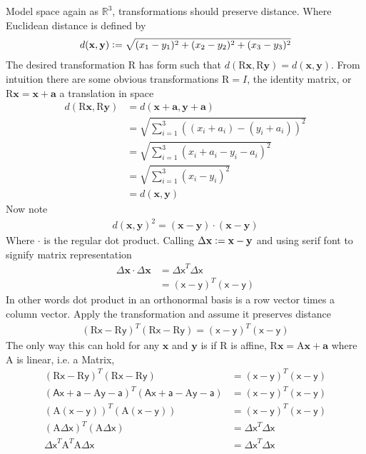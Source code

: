 Model space again as $\mathbb{R}^3$, transformations should preserve distance. Where Euclidean distance is defined by
\begin{align*}
d(\mathbf{x},\mathbf{y})\vcentcolon = \sqrt{(x_1-y_1)^2+(x_2-y_2)^2+(x_3-y_3)^2}
\end{align*}
 The desired transformation $\mathrm{R}$ has form such that $d(\mathrm{R}\mathbf{x},\mathrm{R}\mathbf{y}) = d(\mathbf{x},\mathbf{y})$. From intuition there are some obvious transformations $\mathrm{R}=I$, the identity matrix, or $\mathrm{R}\mathbf{x} = \mathbf{x}+\mathbf{a}$ a translation in space
\begin{align*}
d(\mathrm{R}\mathbf{x},\mathrm{R}\mathbf{y}) &= d(\mathbf{x}+\mathbf{a},\mathbf{y}+\mathbf{a}) \\
&= \sqrt{\sum_{i=1}^3((x_i+a_i)-(y_i+a_i))^2} \\
&= \sqrt{\sum_{i=1}^3(x_i+a_i-y_i-a_i)^2} \\
&= \sqrt{\sum_{i=1}^3(x_i-y_i)^2} \\
&= d(\mathbf{x},\mathbf{y})
\end{align*}
Now note
\begin{align*}
d(\mathbf{x},\mathbf{y})^2=(\mathbf{x}-\mathbf{y})\cdot(\mathbf{x}-\mathbf{y})
\end{align*}
Where $\cdot$ is the regular dot product. Calling $\Delta\mathbf{x}\vcentcolon =\mathbf{x}-\mathbf{y}$ and using serif font to signify matrix representation
\begin{align*}
\Delta\mathbf{x}\cdot\Delta\mathbf{x} &= \mathsf{\Delta x}^T \mathsf{\Delta x} \\
&= (\mathsf{x}-\mathsf{y})^T(\mathsf{x}-\mathsf{y})
\end{align*}
In other words dot product in an orthonormal basis is a row vector times a column vector. Apply the transformation and assume it preserves distance
\begin{align*}
(\mathrm{R}\mathsf{x}-\mathrm{R}\mathsf{y})^T(\mathrm{R}\mathsf{x}-\mathrm{R}\mathsf{y}) = (\mathsf{x}-\mathsf{y})^T(\mathsf{x}-\mathsf{y})
\end{align*}
The only way this can hold for any $\mathbf{x}$ and $\mathbf{y}$ is if $\mathrm{R}$ is affine, $\mathrm{R}\mathbf{x}=\mathrm{A}\mathbf{x}+\mathbf{a}$ where $\mathrm{A}$ is linear, i.e. a Matrix,
\begin{align*}
(\mathrm{R}\mathsf{x}-\mathrm{R}\mathsf{y})^T(\mathrm{R}\mathsf{x}-\mathrm{R}\mathsf{y}) &= (\mathsf{x}-\mathsf{y})^T(\mathsf{x}-\mathsf{y}) \\
(\mathsf{A}\mathsf{x}+\mathsf{a}-\mathrm{A}\mathsf{y}-\mathsf{a})^T(\mathsf{A}\mathsf{x}+\mathsf{a}-\mathrm{A}\mathsf{y}-\mathsf{a}) &= (\mathsf{x}-\mathsf{y})^T(\mathsf{x}-\mathsf{y})\\
(\mathrm{A}(\mathsf{x}-\mathsf{y}))^T(\mathrm{A}(\mathsf{x}-\mathsf{y})) &= (\mathsf{x}-\mathsf{y})^T(\mathsf{x}-\mathsf{y}) \\
(\mathrm{A}\mathsf{\Delta x})^T(\mathrm{A}\mathsf{\Delta x}) &= \mathsf{\Delta x}^T\mathsf{\Delta x} \\
\mathsf{\Delta x}^T\mathrm{A}^T\mathrm{A}\mathsf{\Delta x} &= \mathsf{\Delta x}^T\mathsf{\Delta x}
\end{align*}
